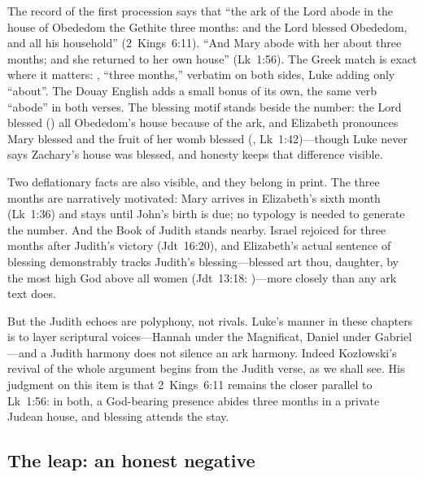 The record of the first procession says that ``the ark of the Lord abode
in the house of Obededom the Gethite three months: and the Lord blessed
Obededom, and all his household''
(2~Kings~6:11). ``And Mary abode with her about three months; and she
returned to her own house'' (Lk~1:56). The Greek match is exact where it
matters: , ``three months,'' verbatim on both sides,
Luke adding only ``about''. The Douay English adds a small bonus of its
own, the same verb ``abode'' in both verses. The blessing motif stands
beside the number: the Lord blessed () all Obededom's
house because of the ark, and Elizabeth pronounces Mary blessed and the
fruit of her womb blessed (,
Lk~1:42)---though Luke never says Zachary's house was blessed, and
honesty keeps that difference visible.

Two deflationary facts are also visible, and they belong in print. The
three months are narratively motivated: Mary arrives in Elizabeth's sixth
month (Lk~1:36) and stays until John's birth is due; no typology is needed
to generate the number. And the Book of Judith stands nearby. Israel
rejoiced for three months after Judith's victory (Jdt~16:20), and
Elizabeth's actual sentence of blessing demonstrably tracks Judith's
blessing---blessed art thou, daughter, by the most high God above all
women (Jdt~13:18: )---more closely than any ark text does.

But the Judith echoes are polyphony, not rivals. Luke's manner in these
chapters is to layer scriptural voices---Hannah under the Magnificat,
Daniel under Gabriel---and a Judith harmony does not silence an ark
harmony. Indeed Kozłowski's revival of the whole argument begins from the
Judith verse, as we shall see. His judgment on this item is that
2~Kings~6:11 remains the closer parallel to Lk~1:56: in both, a
God-bearing presence abides three months in a private Judean house, and
blessing attends the stay.

\subsection{The leap: an honest negative}

